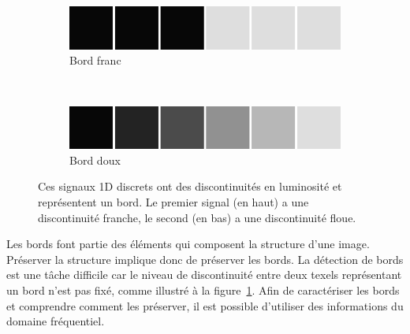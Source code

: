 \begin{figure}[t]
    \centering
    \begin{subfigure}[b]{.45\textwidth}
        \centering
        \includegraphics[width=\textwidth]{contenu/resources/images/discrete_discontinuity}
        \caption{Bord franc}
    \end{subfigure}
    \\
    \vspace{1em}
    \begin{subfigure}[b]{.45\textwidth}
        \centering
        \includegraphics[width=\textwidth]{contenu/resources/images/discrete_smooth}
        \caption{Bord doux}
    \end{subfigure}
    \caption[Difficulté à définir un bord]{Ces signaux 1D discrets ont des discontinuités en luminosité et représentent un bord. Le premier signal (en haut) a une discontinuité franche, le second (en bas) a une discontinuité floue.}
    \label{fig:edge-difficulty}
\end{figure}

Les bords font partie des éléments qui composent la structure d'une image. Préserver la structure implique donc de préserver les bords. La détection de bords est une tâche difficile car le niveau de discontinuité entre deux texels représentant un bord n'est pas fixé, comme illustré à la figure~\ref{fig:edge-difficulty}. Afin de caractériser les bords et comprendre comment les préserver, il est possible d'utiliser des informations du domaine fréquentiel.

\bigskip

